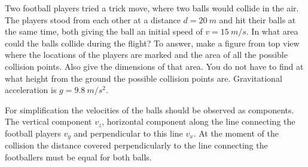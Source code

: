 Two football players tried a trick move, where two balls would collide in the air. The players stood from each other at a distance $d = \SI{20}{m}$ and hit their balls at the same time, both giving the ball an initial speed of $v = \SI{15}{m/s}$. In what area could the balls collide during the flight? To answer, make a figure from top view where the locations of the players are marked and the area of all the possible collision points. Also give the dimensions of that area. You do not have to find at what height from the ground the possible collision points are. Gravitational acceleration is $g = \SI{9,8}{m/s^2}$.

\hinteng
For simplification the velocities of the balls should be observed as components. The vertical component $v_z$, horizontal component along the line connecting the football players $v_y$ and perpendicular to this line $v_x$. At the moment of the collision the distance covered perpendicularly to the line connecting the footballers must be equal for both balls.

